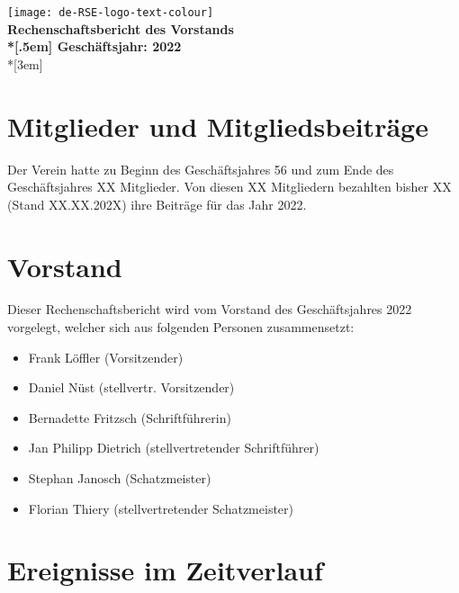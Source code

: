 \newcommand{\jahr}{2022}



\thispagestyle{empty}

\begin{centering}
\texttt{[image: de-RSE-logo-text-colour]}\\
\vspace{3em}
\textbf{
 \Large Rechenschaftsbericht des Vorstands\\*[.5em]
 \normalsize Geschäftsjahr: \jahr}\\*[3em]
\end{centering}

\section{Mitglieder und Mitgliedsbeiträge}

Der Verein hatte zu Beginn des Geschäftsjahres 56 und zum Ende des Geschäftsjahres XX Mitglieder. Von diesen XX Mitgliedern bezahlten bisher XX (Stand XX.XX.202X) ihre Beiträge für das Jahr 2022.

\section{Vorstand}

Dieser Rechenschaftsbericht wird vom Vorstand des Geschäftsjahres 2022 vorgelegt, welcher sich aus folgenden Personen zusammensetzt:

\begin{itemize}
  \setlength{\itemsep}{0pt plus 1pt}
  \item Frank Löffler (Vorsitzender)
  \item Daniel Nüst (stellvertr. Vorsitzender)
  \item Bernadette Fritzsch (Schriftführerin)
  \item Jan Philipp Dietrich (stellvertretender Schriftführer)
  \item Stephan Janosch (Schatzmeister)
  \item Florian Thiery (stellvertretender Schatzmeister)
\end{itemize}

\section{Ereignisse im Zeitverlauf}

